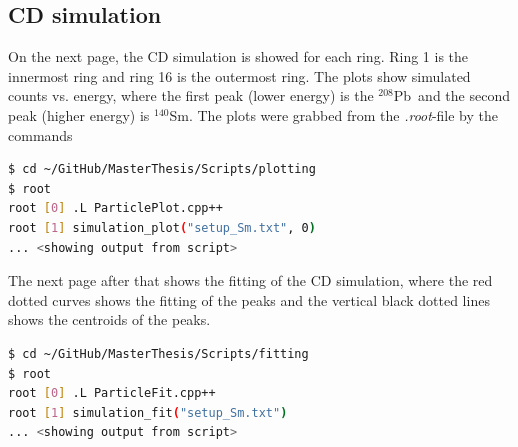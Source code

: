 \documentclass[twoside,english]{uiofysmaster/uiofysmaster}
\newcommand{\Sm}{$^{140}$Sm} %
\newcommand{\Pb}{$^{208}$Pb}
\begin{document}
\begin{appendices}
\chapter{CD simulation}\label{ch:cd_sim}
On the next page, the CD simulation is showed for each ring. Ring 1 is the innermost ring and ring 16 is the outermost ring. The plots show simulated counts vs. energy, where the first peak (lower energy) is the \Pb\ and the second peak (higher energy) is \Sm. The plots were grabbed from the \textit{.root}-file by the commands

\begin{lstlisting}[language=sh]
$ cd ~/GitHub/MasterThesis/Scripts/plotting
$ root
root [0] .L ParticlePlot.cpp++
root [1] simulation_plot("setup_Sm.txt", 0)
... <showing output from script>
\end{lstlisting}

The next page after that shows the fitting of the CD simulation, where the red dotted curves shows the fitting of the peaks and the vertical black dotted lines shows the centroids of the peaks.

\begin{lstlisting}[language=sh]
$ cd ~/GitHub/MasterThesis/Scripts/fitting
$ root
root [0] .L ParticleFit.cpp++
root [1] simulation_fit("setup_Sm.txt")
... <showing output from script>
\end{lstlisting}







\end{appendices}


%


\end{document}
